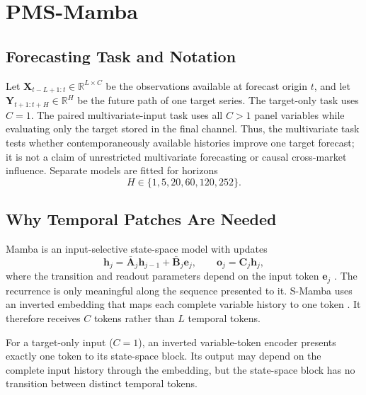 \section{PMS-Mamba}

\subsection{Forecasting Task and Notation}

Let $\mathbf{X}_{t-L+1:t}\in\mathbb{R}^{L\times C}$ be the observations available at forecast origin $t$, and let $\mathbf{Y}_{t+1:t+H}\in\mathbb{R}^{H}$ be the future path of one target series.
The target-only task uses $C=1$.
The paired multivariate-input task uses all $C>1$ panel variables while evaluating only the target stored in the final channel.
Thus, the multivariate task tests whether contemporaneously available histories improve one target forecast; it is not a claim of unrestricted multivariate forecasting or causal cross-market influence.
Separate models are fitted for horizons
\begin{equation}
    H\in\{1,5,20,60,120,252\}.
\end{equation}

\subsection{Why Temporal Patches Are Needed}

Mamba is an input-selective state-space model with updates
\begin{equation}
    \mathbf{h}_j=\bar{\mathbf{A}}_j\mathbf{h}_{j-1}+\bar{\mathbf{B}}_j\mathbf{e}_j,
    \qquad
    \mathbf{o}_j=\mathbf{C}_j\mathbf{h}_j,
\end{equation}
where the transition and readout parameters depend on the input token $\mathbf{e}_j$ \cite{mamba}.
The recurrence is only meaningful along the sequence presented to it.
S-Mamba uses an inverted embedding that maps each complete variable history to one token \cite{smamba}.
It therefore receives $C$ tokens rather than $L$ temporal tokens.

\begin{proposition}
\label{prop:single-token}
For a target-only input ($C=1$), an inverted variable-token encoder presents exactly one token to its state-space block. Its output may depend on the complete input history through the embedding, but the state-space block has no transition between distinct temporal tokens.
\end{proposition}

